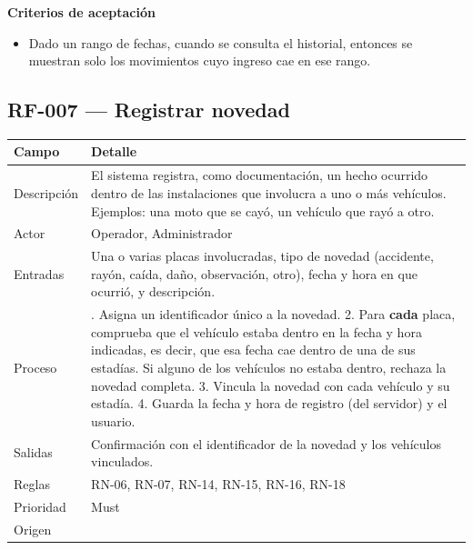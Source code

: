 \textbf{Criterios de aceptación}
\begin{itemize}
  \item Dado un rango de fechas, cuando se consulta el historial, entonces se muestran solo los movimientos cuyo ingreso cae en ese rango.
\end{itemize}

\subsection{RF-007 — Registrar novedad}
\begin{longtable}{>{\raggedright\arraybackslash}p{3.2cm}>{\raggedright\arraybackslash}p{11.2cm}}
\toprule
\textbf{Campo} & \textbf{Detalle}\\
\midrule\endhead
Descripción & El sistema registra, como documentación, un hecho ocurrido dentro de las instalaciones que involucra a uno o más vehículos. Ejemplos: una moto que se cayó, un vehículo que rayó a otro.\\
Actor & Operador, Administrador\\
Entradas & Una o varias placas involucradas, tipo de novedad (accidente, rayón, caída, daño, observación, otro), fecha y hora en que ocurrió, y descripción.\\
Proceso & 1. Asigna un identificador único a la novedad. 2. Para \textbf{cada} placa, comprueba que el vehículo estaba dentro en la fecha y hora indicadas, es decir, que esa fecha cae dentro de una de sus estadías. Si alguno de los vehículos no estaba dentro, rechaza la novedad completa. 3. Vincula la novedad con cada vehículo y su estadía. 4. Guarda la fecha y hora de registro (del servidor) y el usuario.\\
Salidas & Confirmación con el identificador de la novedad y los vehículos vinculados.\\
Reglas & RN-06, RN-07, RN-14, RN-15, RN-16, RN-18\\
Prioridad & Must\\
Origen & [E][U]\\
\bottomrule
\end{longtable}

